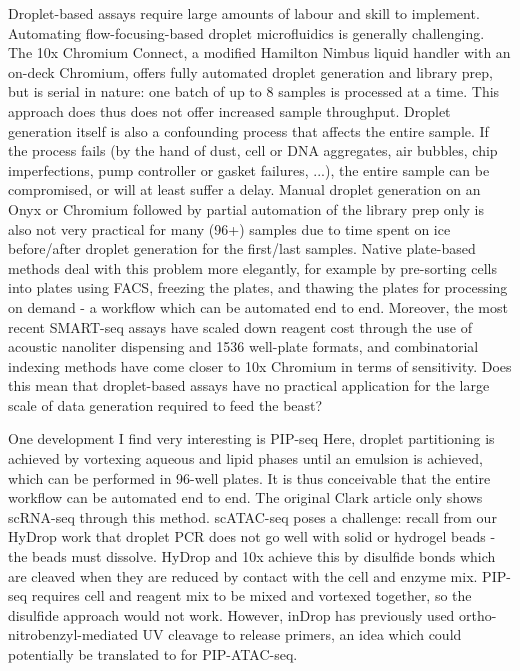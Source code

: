 Droplet-based assays require large amounts of labour and skill to implement. Automating flow-focusing-based droplet microfluidics is generally challenging. The 10x Chromium Connect, a modified Hamilton Nimbus liquid handler with an on-deck Chromium, offers fully automated droplet generation and library prep, but is serial in nature: one batch of up to 8 samples is processed at a time. This approach does thus does not offer increased sample throughput. Droplet generation itself is also a confounding process that affects the entire sample. If the process fails (by the hand of dust, cell or DNA aggregates, air bubbles, chip imperfections, pump controller or gasket failures, ...), the entire sample can be compromised, or will at least suffer a delay. Manual droplet generation on an Onyx or Chromium followed by partial automation of the library prep only is also not very practical for many (96+) samples due to time spent on ice before/after droplet generation for the first/last samples. Native plate-based methods deal with this problem more elegantly, for example by pre-sorting cells into plates using FACS, freezing the plates, and thawing the plates for processing on demand - a workflow which can be automated end to end. Moreover, the most recent SMART-seq assays have scaled down reagent cost through the use of acoustic nanoliter dispensing and 1536 well-plate formats, and combinatorial indexing methods have come closer to 10x Chromium in terms of sensitivity. Does this mean that droplet-based assays have no practical application for the large scale of data generation required to feed the beast?

One development I find very interesting is PIP-seq Here, droplet partitioning is achieved by vortexing aqueous and lipid phases until an emulsion is achieved, which can be performed in 96-well plates. It is thus conceivable that the entire workflow can be automated end to end. The original Clark article only shows scRNA-seq through this method. scATAC-seq poses a challenge: recall from our HyDrop work that droplet PCR does not go well with solid or hydrogel beads - the beads must dissolve. HyDrop and 10x achieve this by disulfide bonds which are cleaved when they are reduced by contact with the cell and enzyme mix. PIP-seq requires cell and reagent mix to be mixed and vortexed together, so the disulfide approach would not work. However, inDrop has previously used ortho-nitrobenzyl-mediated UV cleavage to release primers, an idea which could potentially be translated to for PIP-ATAC-seq.


